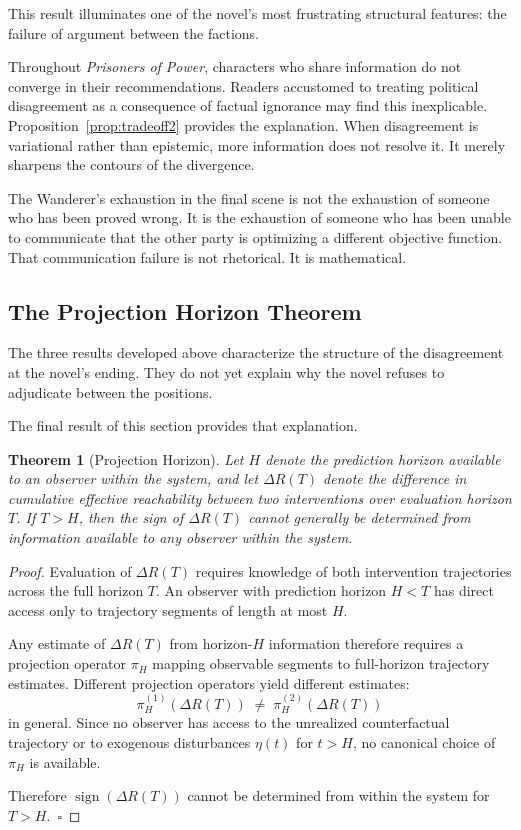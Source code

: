 \documentclass[12pt, a4paper]{article}
\theoremstyle{plain}
\newtheorem{theorem}{Theorem}[section]
\theoremstyle{definition}
\theoremstyle{remark}
\begin{document}
This result illuminates one of the novel's
most frustrating structural features: the
failure of argument between the factions.

Throughout \textit{Prisoners of Power}, characters
who share information do not converge in their
recommendations. Readers accustomed to treating
political disagreement as a consequence of
factual ignorance may find this inexplicable.
Proposition~\ref{prop:tradeoff2} provides the
explanation. When disagreement is variational
rather than epistemic, more information does
not resolve it. It merely sharpens the
contours of the divergence.

The Wanderer's exhaustion in the final scene
is not the exhaustion of someone who has been
proved wrong. It is the exhaustion of someone
who has been unable to communicate that the
other party is optimizing a different objective
function. That communication failure is not
rhetorical. It is mathematical.

\subsection{The Projection Horizon Theorem}

The three results developed above characterize
the structure of the disagreement at the novel's
ending. They do not yet explain why the novel
refuses to adjudicate between the positions.

The final result of this section provides
that explanation.

\begin{theorem}[Projection Horizon]
\label{thm:horizon}
Let $H$ denote the prediction horizon available
to an observer within the system, and let
$\Delta R(T)$ denote the difference in cumulative
effective reachability between two interventions
over evaluation horizon $T$. If $T > H$, then
the sign of $\Delta R(T)$ cannot generally be
determined from information available to any
observer within the system.
\end{theorem}

\begin{proof}
Evaluation of $\Delta R(T)$ requires knowledge
of both intervention trajectories across the
full horizon $T$. An observer with prediction
horizon $H < T$ has direct access only to
trajectory segments of length at most $H$.

Any estimate of $\Delta R(T)$ from horizon-$H$
information therefore requires a projection
operator $\pi_H$ mapping observable segments
to full-horizon trajectory estimates. Different
projection operators yield different estimates:
\[
\pi_H^{(1)}(\Delta R(T))
\;\neq\;
\pi_H^{(2)}(\Delta R(T))
\]
in general. Since no observer has access to
the unrealized counterfactual trajectory or
to exogenous disturbances $\eta(t)$ for
$t > H$, no canonical choice of $\pi_H$
is available.

Therefore $\operatorname{sign}(\Delta R(T))$
cannot be determined from within the system
for $T > H$.~$\square$
\end{proof}
\end{document}
